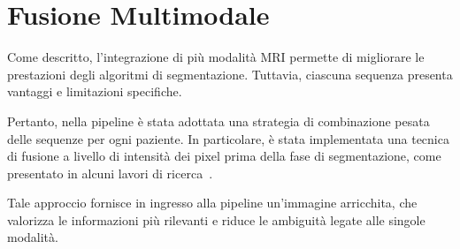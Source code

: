 \section{Fusione Multimodale}
Come descritto, l’integrazione di più modalità MRI permette di migliorare le prestazioni degli algoritmi di segmentazione. Tuttavia, ciascuna sequenza presenta vantaggi e limitazioni specifiche.

Pertanto, nella pipeline è stata adottata una strategia di combinazione pesata delle sequenze per ogni paziente. In particolare, è stata implementata una tecnica di fusione a livello di intensità dei pixel prima della fase di segmentazione, come presentato in alcuni lavori di ricerca~\cite{james2014}.

Tale approccio fornisce in ingresso alla pipeline un’immagine arricchita, che valorizza le informazioni più rilevanti e riduce le ambiguità legate alle singole modalità.